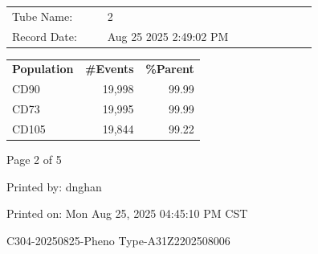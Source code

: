 \documentclass[UTF8,10pt,a4paper,fontset=fandol]{ctexart}
\newcommand{\fieldvalue}[1]{#1}
\begin{document}
\bigskip

\noindent
\begin{tabular}{p{0.25\linewidth}p{0.55\linewidth}}
Tube Name: &
\fieldvalue{2}
\\
Record Date: &
\fieldvalue{Aug 25 2025 2:49:02 PM}
\end{tabular}

\smallskip

\noindent
\begin{tabular}{p{0.28\linewidth}rr}
\textbf{Population} & \textbf{\#Events} & \textbf{\%Parent}\\
\fieldvalue{CD90} &
\fieldvalue{19,998} &
\fieldvalue{99.99}
\\
\fieldvalue{CD73} &
\fieldvalue{19,995} &
\fieldvalue{99.99}
\\
\fieldvalue{CD105} &
\fieldvalue{19,844} &
\fieldvalue{99.22}
\end{tabular}

\vfill

\begin{center}
\scriptsize Page 2 of 5
\end{center}

\hfill\scriptsize Printed by: dnghan

\hfill\scriptsize Printed on: Mon Aug 25, 2025 04:45:10 PM CST

\newpage

\begin{center}
C304-20250825-Pheno Type-A31Z2202508006
\end{center}
\end{document}
